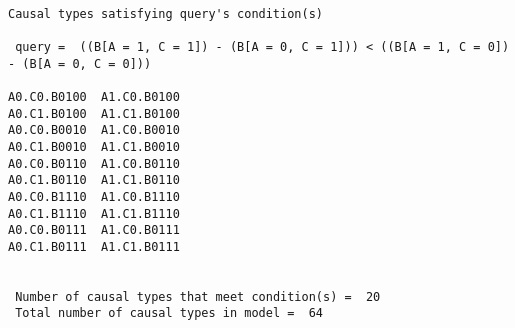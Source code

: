 \documentclass[
  12pt,
]{book}
\begin{document}
\begin{verbatim}

Causal types satisfying query's condition(s)  

 query =  ((B[A = 1, C = 1]) - (B[A = 0, C = 1])) < ((B[A = 1, C = 0]) - (B[A = 0, C = 0])) 

A0.C0.B0100  A1.C0.B0100
A0.C1.B0100  A1.C1.B0100
A0.C0.B0010  A1.C0.B0010
A0.C1.B0010  A1.C1.B0010
A0.C0.B0110  A1.C0.B0110
A0.C1.B0110  A1.C1.B0110
A0.C0.B1110  A1.C0.B1110
A0.C1.B1110  A1.C1.B1110
A0.C0.B0111  A1.C0.B0111
A0.C1.B0111  A1.C1.B0111


 Number of causal types that meet condition(s) =  20
 Total number of causal types in model =  64
\end{verbatim}

  
\end{document}
